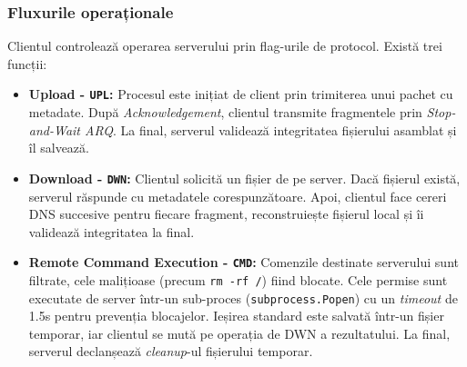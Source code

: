 \subsubsection{Fluxurile operaționale}
Clientul controlează operarea serverului prin flag-urile de protocol. Există trei funcții:

\begin{itemize}
    \item \textbf{Upload - \texttt{UPL}:}
    Procesul este inițiat de client prin trimiterea unui pachet cu metadate. După \textit{Acknowledgement}, clientul transmite fragmentele prin \textit{Stop-and-Wait ARQ}. La final, serverul validează integritatea fișierului asamblat și îl salvează.

    \item \textbf{Download - \texttt{DWN}:}
    Clientul solicită un fișier de pe server. Dacă fișierul există, serverul răspunde cu metadatele corespunzătoare. Apoi, clientul face cereri DNS succesive pentru fiecare fragment, reconstruiește fișierul local și îi validează integritatea la final.

    \item \textbf{Remote Command Execution - \texttt{CMD}:}
    Comenzile destinate serverului sunt filtrate, cele malițioase (precum \texttt{rm -rf /}) fiind blocate. Cele permise sunt executate de server într-un sub-proces (\texttt{subprocess.Popen}) cu un \textit{timeout} de 1.5s pentru prevenția blocajelor. Ieșirea standard este salvată într-un fișier temporar, iar clientul se mută pe operația de DWN a rezultatului. La final, serverul declanșează \textit{cleanup}-ul fișierului temporar.
\end{itemize}